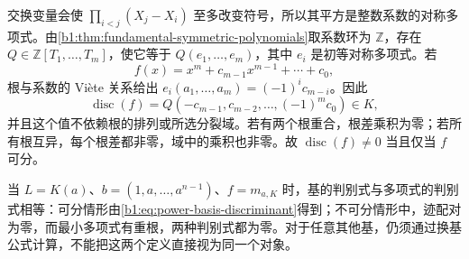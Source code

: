 \ProseParagraphBreak
交换变量会使 \(\prod_{i<j}(X_j-X_i)\) 至多改变符号，所以其平方是整数系数的对称多项式。由\cref{b1:thm:fundamental-symmetric-polynomials}取系数环为 \(\mathbb Z\)，存在 \(Q\in\mathbb Z[T_1,\ldots,T_m]\)，使它等于 \(Q(e_1,\ldots,e_m)\)，其中 \(e_i\) 是初等对称多项式。若
\[
	f(x)=x^m+c_{m-1}x^{m-1}+\cdots+c_0,
\]
根与系数的 Vi\`ete 关系给出 \(e_i(a_1,\ldots,a_m)=(-1)^i c_{m-i}\)。因此
\[
	\operatorname{disc}(f)=Q(-c_{m-1},c_{m-2},\ldots,(-1)^m c_0)\in K,
\]
并且这个值不依赖根的排列或所选分裂域。若有两个根重合，根差乘积为零；若所有根互异，每个根差都非零，域中的乘积也非零。故 \(\operatorname{disc}(f)\ne0\) 当且仅当 \(f\) 可分。

\ProseParagraphBreak
当 \(L=K(a)\)、\(b=(1,a,\ldots,a^{n-1})\)、\(f=m_{a,K}\) 时，基的判别式与多项式的判别式相等：可分情形由\eqref{b1:eq:power-basis-discriminant}得到；不可分情形中，迹配对为零，而最小多项式有重根，两种判别式都为零。对于任意其他基，仍须通过换基公式计算，不能把这两个定义直接视为同一个对象。
